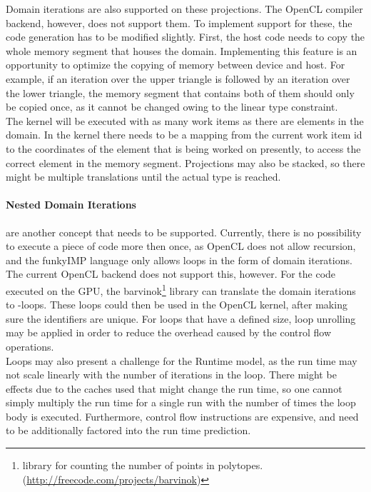 Domain iterations are also supported on these projections. The OpenCL compiler backend, however, does not support them. To implement support for these, the code generation has to be modified slightly. First, the host code needs to copy the whole memory segment that houses the domain. Implementing this feature is an opportunity to optimize the copying of memory between device and host. For example, if an iteration over the upper triangle is followed by an iteration over the lower triangle, the memory segment that contains both of them should only be copied once, as it cannot be changed owing to the linear type constraint. \\

The kernel will be executed with as many work items as there are elements in the domain. In the kernel there needs to be a mapping from the current work item id to the coordinates of the element that is being worked on presently, to access the correct element in the memory segment. Projections may also be stacked, so there might be multiple translations until the actual type is reached. \\

\paragraph{Nested Domain Iterations} are another concept that needs to be supported. Currently, there is no possibility to execute a piece of code more then once, as OpenCL does not allow recursion, and the funkyIMP language only allows loops in the form of domain iterations. The current OpenCL backend does not support this, however. For the code executed on the GPU, the barvinok\footnote{library for counting the number of points in polytopes. (\url{http://freecode.com/projects/barvinok})} library can translate the domain iterations to -loops. These loops could then be used in the OpenCL kernel, after making sure the identifiers are unique. For loops that have a defined size, loop unrolling may be applied in order to reduce the overhead caused by the control flow operations. \\ 

Loops may also present a challenge for the Runtime model, as the run time may not scale linearly with the number of iterations in the loop. There might be effects due to the caches used that might change the run time, so one cannot simply multiply the run time for a single run with the number of times the loop body is executed. Furthermore, control flow instructions are expensive, and need to be additionally factored into the run time prediction. \\


